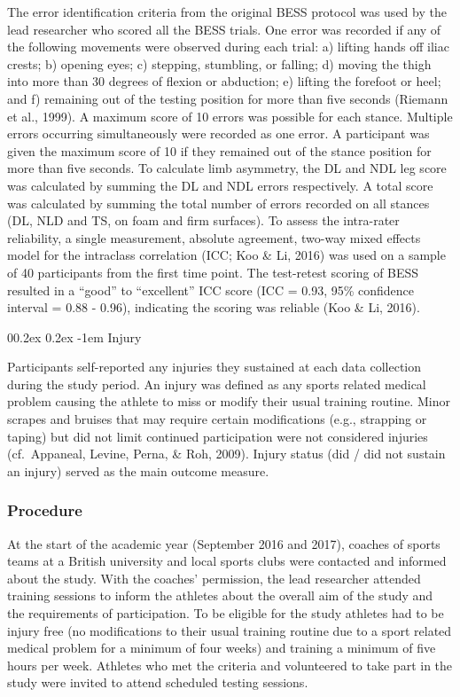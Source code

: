 \documentclass[
  english,
  man,floatsintext]{apa6}
\makeatletter
\renewcommand{\paragraph}{\@startsection{paragraph}{4}{\parindent}%
  {0\baselineskip \@plus 0.2ex \@minus 0.2ex}%
  {-1em}%
  {\normalfont\normalsize\bfseries\itshape\typesectitle}}
\makeatother
\begin{document}
The error identification criteria from the original BESS protocol was used by the lead researcher who scored all the BESS trials.
One error was recorded if any of the following movements were observed during each trial: a) lifting hands off iliac crests;
b) opening eyes;
c) stepping, stumbling, or falling;
d) moving the thigh into more than 30 degrees of flexion or abduction;
e) lifting the forefoot or heel; and
f) remaining out of the testing position for more than five seconds (Riemann et al., 1999).
A maximum score of 10 errors was possible for each stance. Multiple errors occurring simultaneously were recorded as one error.
A participant was given the maximum score of 10 if they remained out of the stance position for more than five seconds.
To calculate limb asymmetry, the DL and NDL leg score was calculated by summing the DL and NDL errors respectively.
A total score was calculated by summing the total number of errors recorded on all stances (DL, NLD and TS, on foam and firm surfaces).
To assess the intra-rater reliability, a single measurement, absolute agreement, two-way mixed effects model for the intraclass correlation (ICC; Koo \& Li, 2016) was used on a sample of 40 participants from the first time point.
The test-retest scoring of BESS resulted in a \enquote{good} to \enquote{excellent} ICC score (ICC = 0.93, 95\% confidence interval = 0.88 - 0.96), indicating the scoring was reliable (Koo \& Li, 2016).

\hypertarget{injury}{%
\paragraph{Injury}\label{injury}}

Participants self-reported any injuries they sustained at each data collection during the study period.
An injury was defined as any sports related medical problem causing the athlete to miss or modify their usual training routine.
Minor scrapes and bruises that may require certain modifications (e.g., strapping or taping) but did not limit continued participation were not considered injuries (cf.~Appaneal, Levine, Perna, \& Roh, 2009).
Injury status (did / did not sustain an injury) served as the main outcome measure.

\hypertarget{procedure}{%
\subsubsection{Procedure}\label{procedure}}

At the start of the academic year (September 2016 and 2017), coaches of sports teams at a British university and local sports clubs were contacted and informed about the study.
With the coaches' permission, the lead researcher attended training sessions to inform the athletes about the overall aim of the study and the requirements of participation.
To be eligible for the study athletes had to be injury free (no modifications to their usual training routine due to a sport related medical problem for a minimum of four weeks) and training a minimum of five hours per week.
Athletes who met the criteria and volunteered to take part in the study were invited to attend scheduled testing sessions.
\end{document}
